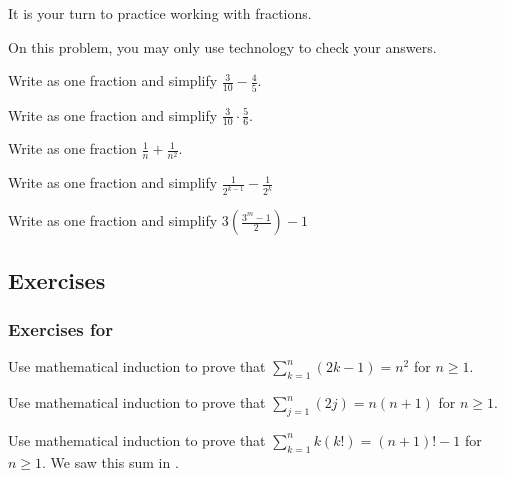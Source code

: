It is your turn to practice working with fractions.

\begin{act} [Fractions] 
    \label{act_fractions}  
    On this problem, you may only use technology to check your answers.
    \begin{actpart} 
        \item Write as one fraction and simplify $\displaystyle \frac{3}{10} - \frac{4}{5}$.
        \item Write as one fraction and simplify $\displaystyle \frac{3}{10} \cdot \frac{5}{6}$.
        \item Write as one fraction $\displaystyle \frac{1}{n}+ \frac{1}{n^2}$.
        \item Write as one fraction and simplify $\displaystyle \frac{1}{2^{k-1}} - \frac{1}{2^k}$
        \item Write as one fraction and simplify $\displaystyle 3 \left(\frac{3^m-1}{2}\right)-1$
    \end{actpart}
\end{act}


\subsection{Exercises}


\subsubsection*{Exercises for 
\subpffsumproofsind}

\begin{exer}[\exerP] %
\label{exer_math_ind_sum_odds}
    Use mathematical induction to prove that $\displaystyle \sum_{k=1}^n(2k -1)=n^2$ for $n\ge 1$.
\end{exer}

\begin{exer}[\exerP] %
\label{exer_math_ind_sum_evens}
    Use mathematical induction to prove that $\displaystyle \sum_{j=1}^n(2j) = n(n+1)$ for $n \ge 1$.
\end{exer}

\begin{exer}[\exerP] %
\label{exer_math_ind_sum_factorials}
    Use mathematical induction to prove that $\displaystyle \sum_{k=1}^nk(k!) = (n+1)!-1$
    for $n\ge 1$. We saw this sum in .
\end{exer}

